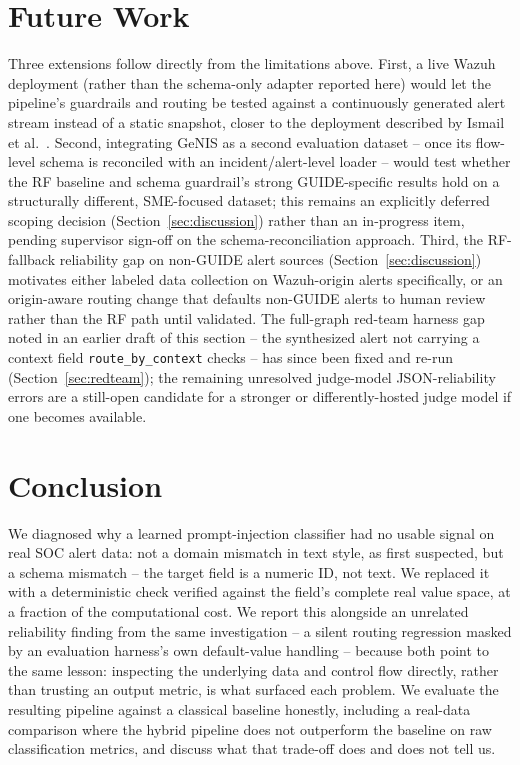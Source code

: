 \documentclass[conference]{IEEEtran}
\begin{document}
\section{Future Work}
\label{sec:futurework}

Three extensions follow directly from the limitations above. First, a live Wazuh deployment
(rather than the schema-only adapter reported here) would let the pipeline's guardrails and
routing be tested against a continuously generated alert stream instead of a static snapshot,
closer to the deployment described by Ismail et al.\ \cite{wazuh2025rag}. Second, integrating
GeNIS \cite{genis2025} as a second evaluation dataset -- once its flow-level schema is reconciled
with an incident/alert-level loader -- would test whether the RF baseline and schema guardrail's
strong GUIDE-specific results hold on a structurally different, SME-focused dataset; this remains
an explicitly deferred scoping decision (Section~\ref{sec:discussion}) rather than an in-progress
item, pending supervisor sign-off on the schema-reconciliation approach. Third, the RF-fallback
reliability gap on non-GUIDE alert sources (Section~\ref{sec:discussion}) motivates either labeled
data collection on Wazuh-origin alerts specifically, or an origin-aware routing change that
defaults non-GUIDE alerts to human review rather than the RF path until validated. The full-graph
red-team harness gap noted in an earlier draft of this section -- the synthesized alert not
carrying a context field \texttt{route\_by\_context} checks -- has since been fixed and re-run
(Section~\ref{sec:redteam}); the remaining unresolved judge-model JSON-reliability errors are a
still-open candidate for a stronger or differently-hosted judge model if one becomes available.

\section{Conclusion}

We diagnosed why a learned prompt-injection classifier had no usable signal on real SOC alert
data: not a domain mismatch in text style, as first suspected, but a schema mismatch -- the target
field is a numeric ID, not text. We replaced it with a deterministic check verified against the
field's complete real value space, at a fraction of the computational cost. We report this
alongside an unrelated reliability finding from the same investigation -- a silent routing
regression masked by an evaluation harness's own default-value handling -- because both point to
the same lesson: inspecting the underlying data and control flow directly, rather than trusting an
output metric, is what surfaced each problem. We evaluate the resulting pipeline against a
classical baseline honestly, including a real-data comparison where the hybrid pipeline does not
outperform the baseline on raw classification metrics, and discuss what that trade-off does and
does not tell us.
\end{document}
